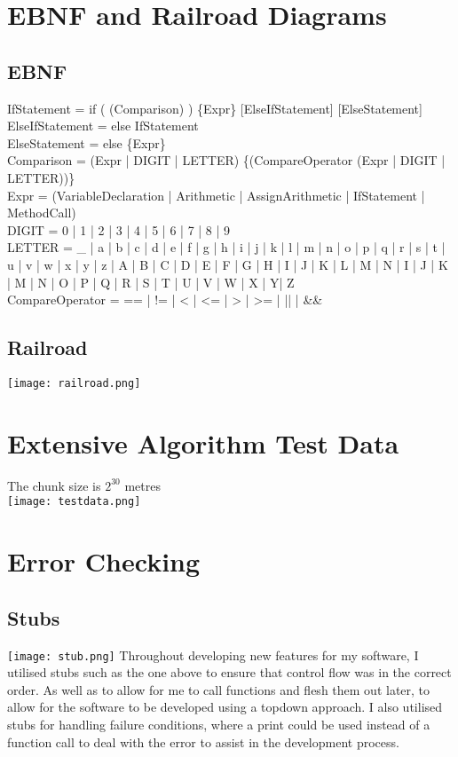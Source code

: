 \documentclass[12pt, DIV=calc]{scrartcl}
\begin{document}
\clearpage
\section{EBNF and Railroad Diagrams}
\subsection{EBNF}
IfStatement = if ( (Comparison) ) \{Expr\} [ElseIfStatement] [ElseStatement] \\            
ElseIfStatement = else IfStatement\\
ElseStatement = else \{Expr\}         \\
Comparison = (Expr | DIGIT | LETTER) \{(CompareOperator (Expr | DIGIT | LETTER))\}\\
Expr = (VariableDeclaration | Arithmetic | AssignArithmetic | IfStatement | MethodCall)\\
DIGIT = 0 | 1 | 2 | 3 | 4 | 5 | 6 | 7 | 8 | 9\\
LETTER = \_ | a | b | c | d | e | f | g | h | i | j | k | l | m | n | o | p | q | r | s | t | u | v | w | x | y | z | 
    A | B | C | D | E | F | G | H | I | J | K | L | M | N | I | J | K | M | N | O | P | Q | R | S | T | U | V | W | X | Y| Z \\

CompareOperator = == | != | < | <= | > | >= | || | \&\&

\subsection{Railroad}
\texttt{[image: railroad.png]}




\clearpage
\section{Extensive Algorithm Test Data}
The chunk size is $2^{30}$ metres \\
\texttt{[image: testdata.png]}




\clearpage
\section{Error Checking}
\subsection{Stubs}
\texttt{[image: stub.png]}
Throughout developing new features for my software, I utilised stubs such as the one above to ensure that control flow was in the correct order. As well as to allow for me to call functions and flesh them out later, to allow for the software to be developed using a top\-down approach. I also utilised stubs for handling failure conditions, where a print could be used instead of a function call to deal with the error to assist in the development process.
\end{document}
